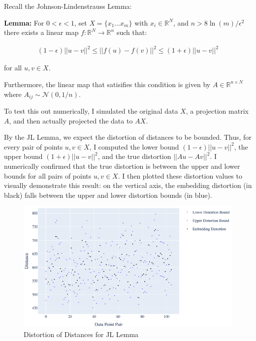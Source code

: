 \documentclass{article}
\begin{document}
    Recall the Johnson-Lindenstrauss Lemma:

    \textbf{Lemma:} For $0<\epsilon<1$, set $X= \{ x_1 \ldots x_m \}$ with $x_i \in \mathbb{R}^N$, and $ n > 8 \ln(m)/ \epsilon^2$ there exists a linear map $f: \mathbb{R}^N \rightarrow \mathbb{R}^n$ such that:

    \begin{align*}
        (1 - \epsilon) ||u - v||^2 \leq ||f(u) - f(v)||^2 \leq (1 + \epsilon) ||u - v||^2
    \end{align*}

    for all $u,v \in X$.

    Furthermore, the linear map that satisifies this condition is given by $A \in \mathbb{R}^{n \times N}$ where $A_{ij} \sim \mathcal{N}(0, 1/n)$.

    To test this out numerically, I simulated the original data $X$, a projection matrix $A$, and then actually projected the data to $AX$.
    
    By the JL Lemma, we expect the distortion of distances to be bounded. Thus, for every pair of points $u, v \in X$, I computed the lower bound $(1-\epsilon) ||u - v||^2$, the upper bound $(1 + \epsilon) ||u-v||^2$, and the true distortion $||Au - Av||^2$. I numerically confirmed that the true distortion is between the upper and lower bounds for all pairs of points $u,v \in X$. I then plotted these distortion values to visually demonstrate this result: on the vertical axis, the embedding distortion (in black) falls between the upper and lower distortion bounds (in blue).

    \begin{figure}[h]
        \label{fig:jl_distortion} 
        \includegraphics[width=1.3\linewidth]{images/q6/distortion.png}
        \caption{Distortion of Distances for JL Lemma}
    \end{figure}

    \clearpage
\end{document}

